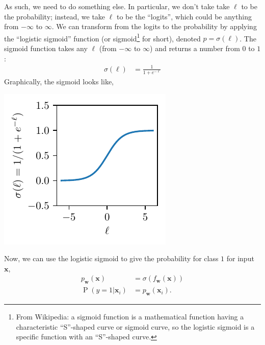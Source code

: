 \documentclass{article}
\newcommand{\bracket}[3]{\left#1 #3 \right#2}
\renewcommand{\b}{\bracket{(}{)}}
\newcommand{\x}{\mathbf{x}}
\renewcommand{\P}{\operatorname{P}\b}
\newcommand{\w}{\mathbf{w}}
\newcommand{\logits}{\ell}
\begin{document}
As such, we need to do something else. 
In particular, we don't take take $\logits$ to be the probability; instead, we take $\logits$ to be the ``logits'', which could be anything from $-\infty$ to $\infty$.
We can transform from the logits to the probability by applying the ``logistic sigmoid'' function (or sigmoid\footnote{From Wikipedia: a sigmoid function is a mathematical function having a characteristic ``S''-shaped curve or sigmoid curve, so the logistic sigmoid is a specific function with an ``S''-shaped curve.} for short), denoted $p = \sigma(\logits)$.
The sigmoid function takes any $\logits$ (from $-\infty$ to $\infty$) and returns a number from $0$ to $1$:
\begin{align}
  \sigma(\logits) &= \frac{1}{1+e^{-\logits}}
\end{align}
Graphically, the sigmoid looks like,
\begin{center}
  \includegraphics{sigmoid.pdf}
\end{center}
Now, we can use the logistic sigmoid to give the probability for class $1$ for input $\x$,
\begin{align}
  \label{eq:sigmoid_prob}
  p_\w(\x) &= \sigma(f_\w(\x))\\
  \P{y=1| \x_i} &= p_\w(\x_i).
\end{align}
\end{document}
